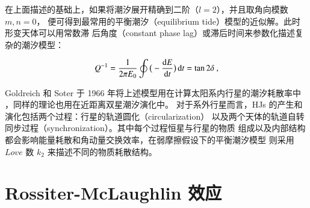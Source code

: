 在上面描述的基础上，如果将潮汐展开精确到二阶（$l=2$），并且取角向模数$m,n = 0 $，
便可得到最常用的平衡潮汐（equilibrium tide）模型的近似解。此时形变天体可以用常数滞
后角度（constant phase lag）或滞后时间来参数化描述复杂的潮汐模型：

\begin{equation} \label{eq:eqtide}
Q^{-1}=\frac{1}{2\pi E_0} \oint \big( -\frac{\mathrm{d} E}{\mathrm{d} t}\big)\,\mathrm{d} t = \tan 2\delta \ ,
\end{equation} 

Goldreich 和 Soter 于 1966 年将上述模型用在计算太阳系内行星的潮汐耗散率中
\cite{Goldreich1966}，同样的理论也用在近距离双星潮汐演化中\cite{Hut1981,Zahn1977}。
对于系外行星而言，HJs 的产生和演化包括两个过程：行星的轨道圆化（circularization）
以及两个天体的轨道自转同步过程（synchronization）。其中每个过程恒星与行星的物质
组成以及内部结构都会影响能量耗散和角动量交换效率，在弱摩擦假设下的平衡潮汐模型
则采用 $Love$ 数 $k_2$ 来描述不同的物质耗散结构。


\section{Rossiter-McLaughlin 效应} \label{sec:rmeffect}

